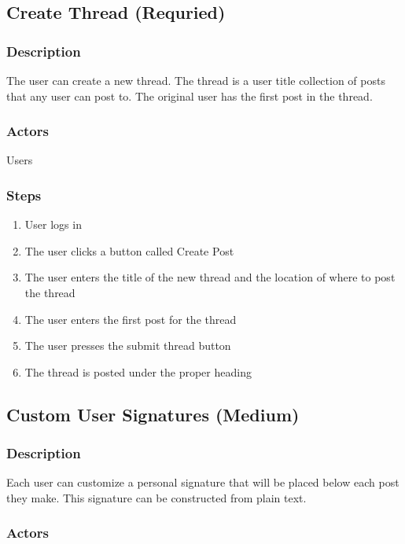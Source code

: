 \documentclass[12pt]{scrartcl}
\begin{document}
\subsection{Create Thread (Requried)}
\subsubsection{Description}

The user can create a new thread. The thread is a user title collection of posts that any user can post to. The original user has the first post in the thread.

\subsubsection{Actors}

Users

\subsubsection{Steps}

\begin{enumerate}
\item User logs in
\item The user clicks a button called Create Post 
\item The user enters the title of the new thread and the location of where to post the thread
\item The user enters the first post for the thread
\item The user presses the submit thread button
\item The thread is posted under the proper heading
\end{enumerate}

\subsection{Custom User Signatures (Medium)}
\subsubsection{Description}

Each user can customize a personal signature that will be placed below each post they make. This signature can be constructed from plain text.

\subsubsection{Actors}
\end{document}
